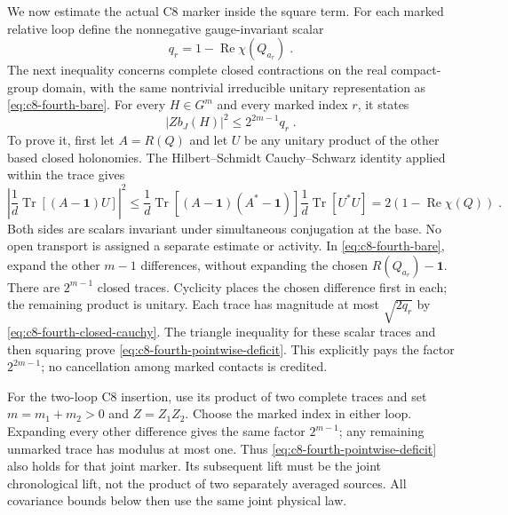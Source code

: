 \documentclass[11pt]{article}
\newcommand{\id}{\mathbf 1}
\begin{document}
We now estimate the actual C8 marker inside the square term. For each
marked relative loop define the nonnegative gauge-invariant scalar
\begin{equation}\label{eq:c8-fourth-deficit}
    q_r=1-\operatorname{Re}\chi(Q_{a_r})\;.
\end{equation}
The next inequality concerns complete closed contractions on the real
compact-group domain, with the same nontrivial irreducible unitary
representation as \eqref{eq:c8-fourth-bare}. For every $H\in G^m$ and
every marked index $r$, it states
\begin{equation}\label{eq:c8-fourth-pointwise-deficit}
    |Zb_J(H)|^2\leq 2^{2m-1}q_r\;.
\end{equation}
To prove it, first let $A=R(Q)$ and let $U$ be any unitary product of
the other based closed holonomies. The Hilbert--Schmidt
Cauchy--Schwarz identity applied within the trace gives
\begin{equation}\label{eq:c8-fourth-closed-cauchy}
    \left|\frac{1}{d}\operatorname{Tr}[(A-\id)U]\right|^2
        \leq\frac{1}{d}\operatorname{Tr}[(A-\id)(A^*-\id)]
             \frac{1}{d}\operatorname{Tr}[U^*U]
        =2(1-\operatorname{Re}\chi(Q))\;.
\end{equation}
Both sides are scalars invariant under simultaneous conjugation at the
base. No open transport is assigned a separate estimate or activity.
In \eqref{eq:c8-fourth-bare}, expand the other $m-1$ differences,
without expanding the chosen $R(Q_{a_r})-\id$. There are $2^{m-1}$
closed traces. Cyclicity places the chosen difference first in each;
the remaining product is unitary. Each trace has magnitude at most
$\sqrt{2q_r}$ by \eqref{eq:c8-fourth-closed-cauchy}. The triangle
inequality for these scalar traces and then squaring prove
\eqref{eq:c8-fourth-pointwise-deficit}. This explicitly pays the
factor $2^{2m-1}$; no cancellation among marked contacts is credited.

For the two-loop C8 insertion, use its product of two complete traces
and set $m=m_1+m_2>0$ and $Z=Z_1Z_2$. Choose the marked index in
either loop. Expanding every other difference gives the same factor
$2^{m-1}$; any remaining unmarked trace has modulus at most one.
Thus \eqref{eq:c8-fourth-pointwise-deficit} also holds for that joint
marker. Its subsequent lift must be the joint chronological lift,
not the product of two separately averaged sources. All covariance
bounds below then use the same joint physical law.
\end{document}
